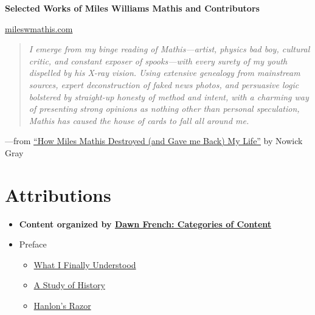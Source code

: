 \documentclass{article}
\newcommand{\insertmydocument}[2]{ %
  \item \href{http://www.mileswmathis.com/#2}{#1}
}
\begin{document}
\begin{titlepage}
    \centering
    \vfill
    {\Huge \bfseries Selected Works of Miles Williams Mathis and Contributors\par}
    \vfill
    {\Large \href{http://mileswmathis.com}{mileswmathis.com}}
    \vfill
\end{titlepage}

\newpage
\thispagestyle{empty}
\vspace*{\fill}

\begin{quote}
\centering
\textit{I emerge from my binge reading of Mathis—artist, physics bad boy, cultural critic, and constant exposer of spooks—with every surety of my youth dispelled by his X-ray vision. Using extensive genealogy from mainstream sources, expert deconstruction of faked news photos, and persuasive logic bolstered by straight-up honesty of method and intent, with a charming way of presenting strong opinions as nothing other than personal speculation, Mathis has caused the house of cards to fall all around me.}
\end{quote}

\centering —from \href{https://nowickgray.com/last-curtain-miles-mathis/}{“How Miles Mathis Destroyed (and Gave me Back) My Life”}
\centering by Nowick Gray

\vspace*{\fill}

\newpage
\section*{Attributions}

\begin{itemize}
  \item \textbf{Content organized by \href{https://theresearchofmilesmathis.substack.com/p/categories-of-content}{Dawn French: Categories of Content}}
\end{itemize}

\newpage

\tableofcontents

\begin{itemize}
  \item Preface
  \begin{itemize}
      \insertmydocument{What I Finally Understood}{guru.pdf}
      \insertmydocument{A Study of History}{history.pdf}
      \insertmydocument{Hanlon's Razor}{hanlon.pdf}
  \end{itemize}
\end{itemize}
\end{document}
